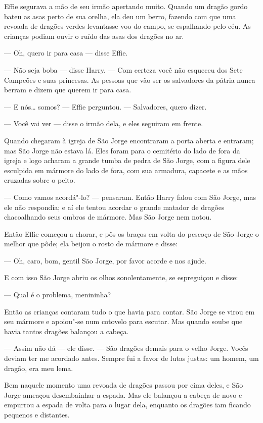 Effie segurava a mão de seu irmão apertando muito. Quando um dragão
gordo bateu as asas perto de sua orelha, ela deu um berro, fazendo com
que uma revoada de dragões verdes levantasse voo do campo, se
espalhando pelo céu. As crianças podiam ouvir o ruído das asas dos dragões
no ar.

--- Oh, quero ir para casa --- disse Effie.

--- Não seja boba --- disse Harry. --- Com certeza você não esqueceu dos
Sete Campeões e suas princesas. As pessoas que vão ser os salvadores
da pátria nunca berram e dizem que querem ir para casa. 

--- E nós\ldots{} somos? --- Effie perguntou. --- Salvadores, quero dizer.

--- Você vai ver --- disse o irmão dela, e eles seguiram em frente.

Quando chegaram à igreja de São Jorge encontraram a porta aberta e
entraram; mas São Jorge não estava lá. Eles foram para
o cemitério do lado de fora da igreja e logo acharam a grande tumba
de pedra de São Jorge, com a figura dele esculpida em mármore do lado
de fora, com sua armadura, capacete e as mãos cruzadas sobre o
peito.

--- Como vamos acordá"-lo? --- pensaram. Então Harry falou com São Jorge,
mas ele não respondia; e aí ele tentou acordar o grande matador de
dragões chacoalhando seus ombros de mármore. Mas São Jorge nem notou.

Então Effie começou a chorar, e pôs os braços em volta do pescoço de
São Jorge o melhor que pôde; ela beijou o rosto de mármore e disse:

--- Oh, caro, bom, gentil São Jorge, por favor acorde e nos ajude.

E com isso São Jorge abriu os olhos sonolentamente, se espreguiçou e
disse:

--- Qual é o problema, menininha?

Então as crianças contaram tudo o que havia para contar. São Jorge se virou
em seu mármore e apoiou"-se num cotovelo para escutar. Mas quando
soube que havia tantos dragões balançou a cabeça.

--- Assim não dá --- ele disse. --- São dragões demais para o velho Jorge.
Vocês deviam ter me acordado antes. Sempre fui a favor de lutas
justas: um homem, um dragão, era meu lema.

Bem naquele momento uma revoada de dragões passou por cima deles, e
São Jorge ameaçou desembainhar a espada. Mas ele balançou a cabeça
de novo e empurrou a espada de volta para o lugar dela, enquanto os
dragões iam ficando pequenos e distantes.

